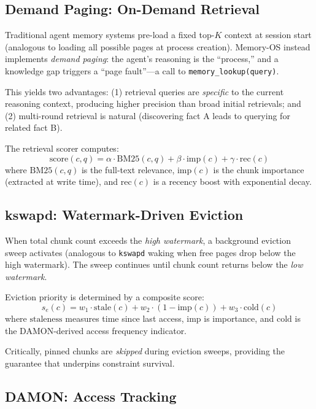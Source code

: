 \documentclass[10pt,twocolumn]{article}
\begin{document}
\subsection{Demand Paging: On-Demand Retrieval}

Traditional agent memory systems pre-load a fixed top-$K$ context at session start (analogous to loading all possible pages at process creation). Memory-OS instead implements \emph{demand paging}: the agent's reasoning is the ``process,'' and a knowledge gap triggers a ``page fault''---a call to \texttt{memory\_lookup(query)}.

This yields two advantages: (1) retrieval queries are \emph{specific} to the current reasoning context, producing higher precision than broad initial retrievals; and (2) multi-round retrieval is natural (discovering fact A leads to querying for related fact B).

The retrieval scorer computes:
\begin{equation}
  \text{score}(c, q) = \alpha \cdot \text{BM25}(c, q) + \beta \cdot \text{imp}(c) + \gamma \cdot \text{rec}(c)
\end{equation}
where $\text{BM25}(c, q)$ is the full-text relevance, $\text{imp}(c)$ is the chunk importance (extracted at write time), and $\text{rec}(c)$ is a recency boost with exponential decay.

\subsection{kswapd: Watermark-Driven Eviction}

When total chunk count exceeds the \emph{high watermark}, a background eviction sweep activates (analogous to \texttt{kswapd} waking when free pages drop below the high watermark). The sweep continues until chunk count returns below the \emph{low watermark}.

Eviction priority is determined by a composite score:
\begin{equation}
  s_e(c) = w_1 \!\cdot\! \text{stale}(c) + w_2 \!\cdot\! (1{-}\text{imp}(c)) + w_3 \!\cdot\! \text{cold}(c)
\end{equation}
where $\text{staleness}$ measures time since last access, $\text{imp}$ is importance, and $\text{cold}$ is the DAMON-derived access frequency indicator.

Critically, pinned chunks are \emph{skipped} during eviction sweeps, providing the guarantee that underpins constraint survival.

\subsection{DAMON: Access Tracking}
\end{document}
